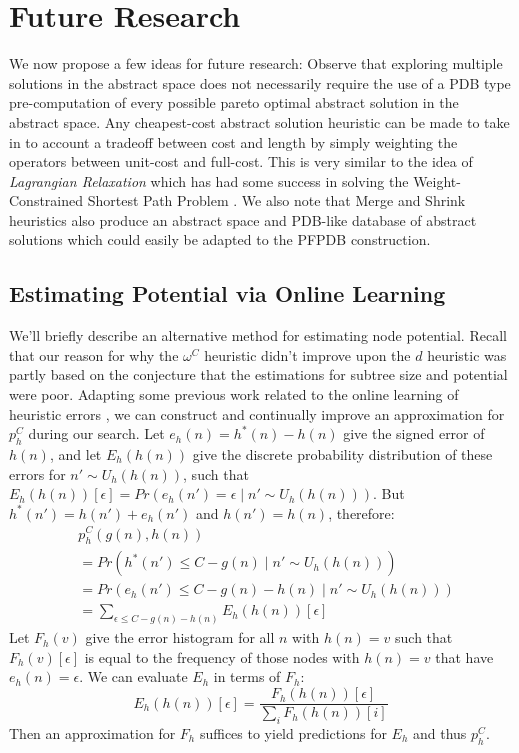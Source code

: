 \documentclass[letterpaper]{article} %
\begin{document}
\section{Future Research}

We now propose a few ideas for future research:
Observe that exploring multiple solutions
in the abstract space does not necessarily require the use of a PDB
type pre-computation of every
possible pareto optimal abstract solution in the abstract space.
Any cheapest-cost abstract solution heuristic
can be made to take in to account a tradeoff between cost and length by simply
weighting the operators between unit-cost and full-cost.
This is very similar to the idea of \textit{Lagrangian Relaxation}
which has had some success in solving the Weight-Constrained Shortest
Path Problem \cite{carlyle2008lagrangian}.
We also note that Merge and Shrink heuristics \cite{helmert2007flexible} also produce an abstract
space and PDB-like database of abstract solutions which could easily be adapted to the PFPDB construction.

\subsection{Estimating Potential via Online Learning}

We'll briefly describe an alternative method for estimating node potential.
Recall that our reason for why the \(\omega^C\) heuristic
didn't improve upon the \(d\) heuristic was partly based on the 
conjecture that the estimations for subtree size and potential were
poor.
Adapting some previous work related to the online learning of heuristic errors \cite{thayer2008fast},
we can construct and continually improve an approximation for \(p^C_h\) during our search.
Let \(e_h(n) = h^*(n) - h(n)\) give the signed error of \(h(n)\),
and let \(E_h(h(n))\) give the discrete probability distribution of these errors
for \(n' \sim U_h(h(n))\), such that \(E_h(h(n))[\epsilon] = Pr(e_h(n') = \epsilon  \mid n' \sim U_h(h(n)))\).
But \(h^*(n') = h(n') + e_h(n')\) and \(h(n') = h(n)\), therefore:
\begin{align*}
  &p^C_h(g(n), h(n)) \\
  &= Pr(h^*(n') \leq C - g(n) \mid n' \sim U_h(h(n))) \\
  &= Pr(e_h(n') \leq C - g(n) - h(n) \mid n' \sim U_h(h(n))) \\
  &= \sum_{\epsilon \leq C - g(n) - h(n)} E_h(h(n))[\epsilon]
\end{align*}
Let \(F_h(v)\) give the error histogram for all \(n\) with \(h(n) = v\)
such that \(F_h(v)[\epsilon]\) is equal to the frequency of those nodes with \(h(n) = v\) that
have \(e_h(n) = \epsilon\). We can evaluate \(E_h\) in terms of \(F_h\):
\[E_h(h(n))[\epsilon] = \frac{F_h(h(n))[\epsilon]}{\sum_{i}F_h(h(n))[i]}\]
Then an approximation for \(F_h\) suffices to yield predictions for \(E_h\)
and thus \(p^C_h\).
\end{document}
